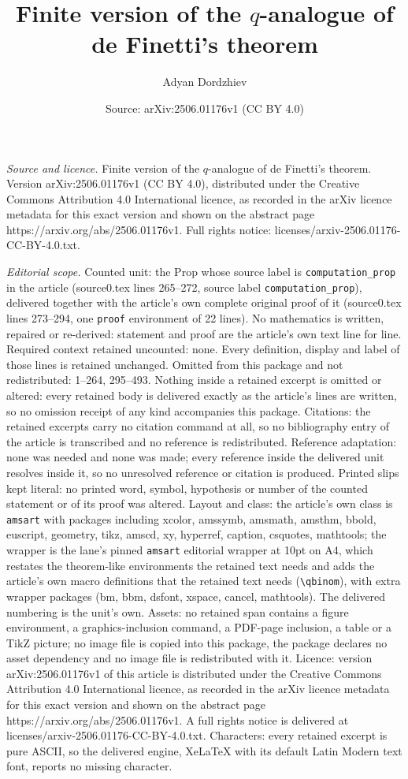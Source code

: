 \documentclass[10pt,a4paper]{amsart}
\title[Finite version of the $q$-analogue of de Finetti's theorem]{Finite version of the $q$-analogue of de Finetti's theorem}
\author{Adyan Dordzhiev}
\date{Source: arXiv:2506.01176v1 (CC BY 4.0)}
\begin{document}
\maketitle

\noindent\emph{Source and licence.} Finite version of the $q$-analogue of de Finetti's theorem. Version arXiv:2506.01176v1 (CC BY 4.0), distributed under the Creative Commons Attribution 4.0 International licence, as recorded in the arXiv licence metadata for this exact version and shown on the abstract page https://arxiv.org/abs/2506.01176v1. Full rights notice: licenses/arxiv-2506.01176-CC-BY-4.0.txt.\par\smallskip

\noindent\textit{Editorial scope.} Counted unit: the Prop whose source label is \texttt{computation\_prop} in the article (source0.tex lines 265--272, source label \texttt{computation\_prop}), delivered together with the article's own complete original proof of it (source0.tex lines 273--294, one \texttt{proof} environment of 22 lines). No mathematics is written, repaired or re-derived: statement and proof are the article's own text line for line. Required context retained uncounted: none. Every definition, display and label of those lines is retained unchanged. Omitted from this package and not redistributed: 1--264, 295--493. Nothing inside a retained excerpt is omitted or altered: every retained body is delivered exactly as the article's lines are written, so no omission receipt of any kind accompanies this package. Citations: the retained excerpts carry no citation command at all, so no bibliography entry of the article is transcribed and no reference is redistributed. Reference adaptation: none was needed and none was made; every reference inside the delivered unit resolves inside it, so no unresolved reference or citation is produced. Printed slips kept literal: no printed word, symbol, hypothesis or number of the counted statement or of its proof was altered. Layout and class: the article's own class is \texttt{amsart} with packages including xcolor, amssymb, amsmath, amsthm, bbold, euscript, geometry, tikz, amscd, xy, hyperref, caption, csquotes, mathtools; the wrapper is the lane's pinned \texttt{amsart} editorial wrapper at 10pt on A4, which restates the theorem-like environments the retained text needs and adds the article's own macro definitions that the retained text needs (\texttt{\textbackslash qbinom}), with extra wrapper packages (bm, bbm, dsfont, xspace, cancel, mathtools). The delivered numbering is the unit's own. Assets: no retained span contains a figure environment, a graphics-inclusion command, a PDF-page inclusion, a table or a TikZ picture; no image file is copied into this package, the package declares no asset dependency and no image file is redistributed with it. Licence: version arXiv:2506.01176v1 of this article is distributed under the Creative Commons Attribution 4.0 International licence, as recorded in the arXiv licence metadata for this exact version and shown on the abstract page https://arxiv.org/abs/2506.01176v1. A full rights notice is delivered at licenses/arxiv-2506.01176-CC-BY-4.0.txt. Characters: every retained excerpt is pure ASCII, so the delivered engine, XeLaTeX with its default Latin Modern text font, reports no missing character.
\end{document}
